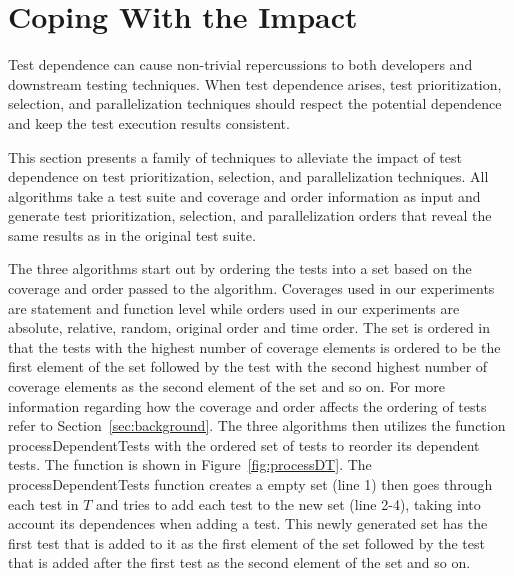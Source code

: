 \section{Coping With the Impact}
\label{sec:cope}

Test dependence can cause non-trivial repercussions
to both developers and downstream testing techniques.
When test dependence arises, test prioritization,
selection, and parallelization techniques
should respect the potential dependence and keep the
test execution results consistent.

This section presents a family of techniques to alleviate the
impact of test dependence on test prioritization, selection,
and parallelization techniques. All algorithms take a test suite and
coverage and order information as input and generate
test prioritization, selection, and parallelization orders that reveal
the same results as in the original test suite.


The three algorithms start out by ordering the tests into a set 
based on the coverage and order passed to the algorithm.
Coverages used in our experiments are statement
and function level while orders used in our experiments are absolute,
relative, random, original order and time order. The set is ordered
in that the tests with the highest number of coverage elements
is ordered to be the first element of the set followed by the test with
the second highest number of coverage elements as the second
element of the set and so on. For more information regarding how the coverage
and order affects the ordering of tests refer to Section~\ref{sec:background}.
The three algorithms then utilizes the function processDependentTests
with the ordered set of tests to reorder its dependent tests.
The function is shown in Figure~\ref{fig:processDT}.
The processDependentTests function creates a empty set (line 1)
then goes through each test in $\mathit{T}$ and tries to add each
test to the new set (line 2-4), taking into account its dependences
when adding a test. This newly generated set has the first test
that is added to it as the first element of the set followed by the
test that is added after the first test as the second element of the set
and so on.


